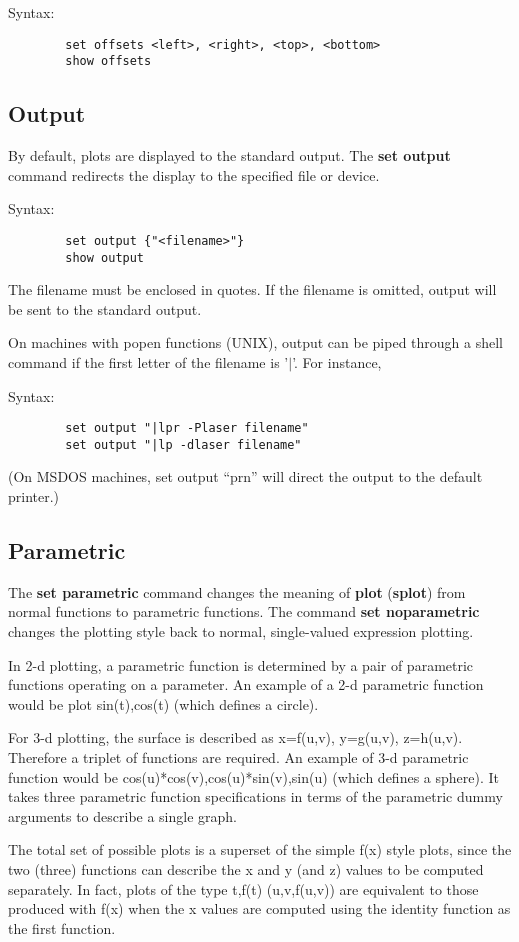 Syntax:
\begin{verbatim}
        set offsets <left>, <right>, <top>, <bottom>
        show offsets
\end{verbatim}
\subsection{Output}
By default, plots are displayed to the standard output. The {\bf set
output} command redirects the display to the specified file or
device.

Syntax:
\begin{verbatim}
        set output {"<filename>"}
        show output
\end{verbatim}

The filename must be enclosed in quotes. If the filename is
omitted, output will be sent to the standard output.

On machines with popen functions (UNIX), output can be piped
through a shell command if the first letter of the filename
is '$|$'.  For instance,

Syntax:
\begin{verbatim}
        set output "|lpr -Plaser filename"
        set output "|lp -dlaser filename"
\end{verbatim}

(On MSDOS machines, set output ``prn'' will direct the output
to the default printer.)

\subsection{Parametric}
The {\bf set parametric} command changes the meaning of {\bf plot} ({\bf splot})
from normal functions to parametric functions. The command
{\bf set noparametric} changes the plotting style back to normal,
single-valued expression plotting.

In 2-d plotting, a parametric function is determined by a pair
of parametric functions operating on a parameter. An example
of a 2-d parametric function would be plot sin(t),cos(t) (which
defines a circle).

For 3-d plotting, the surface is described as x=f(u,v), y=g(u,v),
z=h(u,v). Therefore a triplet of functions are required. An example of
3-d parametric function would be cos(u)*cos(v),cos(u)*sin(v),sin(u)
(which defines a sphere). It takes three parametric function
specifications in terms of the parametric dummy arguments to describe
a single graph.

The total set of possible plots is a superset of the simple f(x)
style plots, since the two (three) functions can describe the
x and y (and z) values to be computed separately. In fact,
plots of the type t,f(t) (u,v,f(u,v)) are equivalent to those
produced with f(x) when the x values are computed using the
identity function as the first function.


